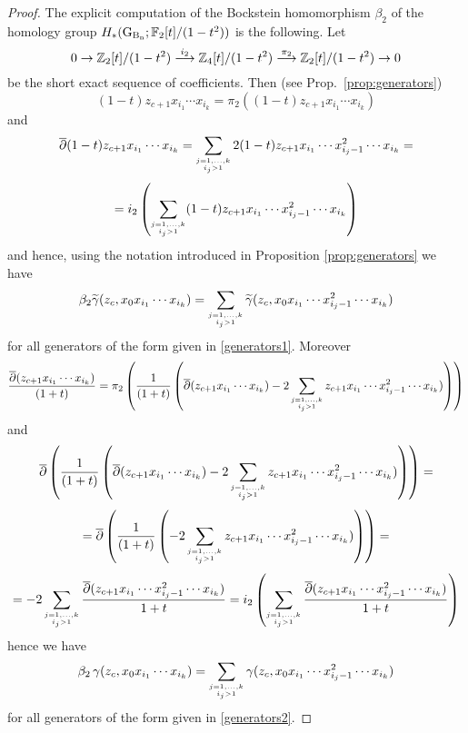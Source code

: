 \begin{proof}
The explicit computation of the Bockstein homomorphism $\beta_2$ of the homology group $H_*(\operatorname{G_{B_{n}}}; \mathbb{F}_2[t]/(1-t^2))$ is the following. Let $$0 \to \mathbb{Z}_2[t]/(1-t^2) \stackrel{i_2}{\longrightarrow} \mathbb{Z}_4[t]/(1-t^2) \stackrel{\pi_2}{\longrightarrow} \mathbb{Z}_2[t]/(1-t^2) \to 0$$ be the short exact sequence of coefficients. Then (see Prop.~\ref{prop:generators})
$$(1-t) z_{c+1} x_{i_1} \cdots x_{i_k} = \pi_2 ((1-t) z_{c+1} x_{i_1} \cdots x_{i_k} )$$
and
$$
\overline{\partial} (1-t) z_{c+1} x_{i_1} \cdots x_{i_k} = \sum_{
	\substack{ {}_{j=1, \ldots, k}\\ {}_{i_j>1} }
}
2 (1-t) z_{c+1} x_{i_1} \cdots x_{i_j-1}^2 \cdots x_{i_k} =
$$
$$
= i_2 \left(\sum_{
	\substack{ {}_{j=1, \ldots, k}\\ {}_{i_j>1} }
}
(1-t) z_{c+1} x_{i_1} \cdots x_{i_j-1}^2 \cdots x_{i_k} \right)
$$ and hence, using the notation introduced in Proposition \ref{prop:generators} we have
\begin{equation}\label{bockstein1}
\beta_2 \widetilde{\gamma} (z_c, x_0x_{i_1} \cdots x_{i_k})   =\sum_{
	\substack{ {}_{j=1, \ldots, k}\\ {}_{i_j>1} }
} \widetilde{\gamma} (z_c, x_0 x_{i_1} \cdots x_{i_j-1}^2 \cdots x_{i_k}) 
\end{equation}
for all generators of the form given in \eqref{generators1}.
Moreover 
$$\frac{\overline{\partial}(z_{c+1}x_{i_1} \cdots x_{i_k})}{(1+t)} = \pi_2 \left( \frac{1}{(1+t)}\left( \overline{\partial}(z_{c+1}x_{i_1} \cdots x_{i_k}) - 2\sum_{
	\substack{ {}_{j=1, \ldots, k}\\ {}_{i_j>1} }
}
z_{c+1} x_{i_1} \cdots x_{i_j-1}^2 \cdots x_{i_k} ) \right) \right) $$
and
$$
\overline{\partial} \left( \frac{1}{(1+t)}\left( \overline{\partial}(z_{c+1}x_{i_1} \cdots x_{i_k}) - 2\sum_{
		\substack{ {}_{j=1, \ldots, k}\\ {}_{i_j>1} }
	}
	z_{c+1} x_{i_1} \cdots x_{i_j-1}^2 \cdots x_{i_k} ) \right) \right) =
$$
$$
=\overline{\partial} \left( \frac{1}{(1+t)}\left(- 2\sum_{
	\substack{ {}_{j=1, \ldots, k}\\ {}_{i_j>1} }
}
z_{c+1} x_{i_1} \cdots x_{i_j-1}^2 \cdots x_{i_k} ) \right) \right) =
$$
$$
= -2 \sum_{
	\substack{ {}_{j=1, \ldots, k}\\ {}_{i_j>1} }
} \frac{\overline{\partial}(z_{c+1} x_{i_1} \cdots x_{i_j-1}^2 \cdots x_{i_k} ) }{1+t}=
i_2 \left( \sum_{
	\substack{ {}_{j=1, \ldots, k}\\ {}_{i_j>1} }
} \frac{\overline{\partial}(z_{c+1} x_{i_1} \cdots x_{i_j-1}^2 \cdots x_{i_k} ) }{1+t} \right)
$$
hence we have
\begin{equation}\label{bockstein2}
\beta_2 \operatorname{\gamma} (z_c, x_0x_{i_1} \cdots x_{i_k}) =\sum_{
	\substack{ {}_{j=1, \ldots, k}\\ {}_{i_j>1} }
}  \operatorname{\gamma} (z_c, x_{0} x_{i_1}  \cdots x_{i_j-1}^2 \cdots  x_{i_k})
\end{equation}
for all generators of the form given in \eqref{generators2}.


\end{proof}
